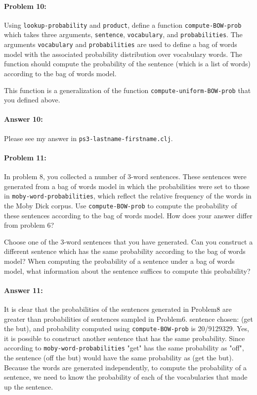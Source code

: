 \documentclass[10pt]{article}
\newcommand{\PSnum}{3}
\begin{document}
\paragraph{Problem 10:}

Using \texttt{lookup-probability} and \texttt{product}, define a
function \texttt{compute-BOW-prob} which takes three arguments,
\texttt{sentence}, \texttt{vocabulary}, and
\texttt{probabilities}. The arguments \texttt{vocabulary} and
\texttt{probabilities} are used to define a bag of words model with
the associated probability distribution over vocabulary words. The
function should compute the probability of the sentence (which is a
list of words) according to the bag of words model.

This function is a generalization of the function
\texttt{compute-uniform-BOW-prob} that you defined above.

\paragraph{Answer 10:} Please see my answer in
\texttt{ps\PSnum-lastname-firstname.clj}.

\noindent\hrulefill %

\paragraph{Problem 11:}

In problem 8, you collected a number of 3-word sentences. These
sentences were generated from a bag of words model in which the
probabilities were set to those in \texttt{moby-word-probabilities},
which reflect the relative frequency of the words in the Moby Dick
corpus. Use \texttt{compute-BOW-prob} to compute the probability of
these sentences according to the bag of words model. How does your
answer differ from problem 6?

Choose one of the 3-word sentences that you have generated. Can you
construct a different sentence which has the same probability
according to the bag of words model? When computing the probability of
a sentence under a bag of words model, what information about the
sentence suffices to compute this probability?

\paragraph{Answer 11:} It is clear that the probabilities of the sentences generated in Problem8 are greater than probabilities of sentences sampled in Problem6. sentence chosen: (get the but), and probability computed using \texttt{compute-BOW-prob} is 20/9129329. \newline Yes, it is possible to construct another sentence that has the same probability. Since according to \texttt{moby-word-probabilities} "get" has the same probability as "off", the sentence (off the but) would have the same probability as (get the but). Because the words are generated independently, to compute the probability of a sentence, we need to know the probability of each of the vocabularies that made up the sentence.    
\end{document}
